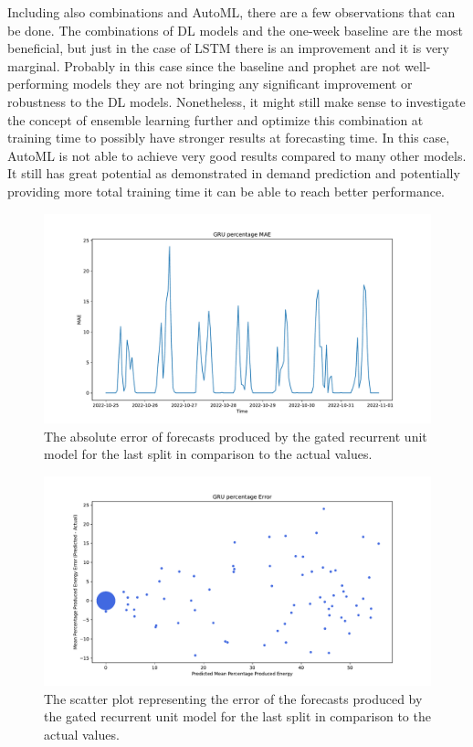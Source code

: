 Including also combinations and AutoML, there are a few observations that can be done.
The combinations of DL models and the one-week baseline are the most beneficial, but just in the case of LSTM there is an improvement and it is very marginal.
Probably in this case since the baseline and prophet are not well-performing models they are not bringing any significant improvement or robustness to the DL models.
Nonetheless, it might still make sense to investigate the concept of ensemble learning further and optimize this combination at training time to possibly have stronger results at forecasting time.
In this case, AutoML is not able to achieve very good results compared to many other models.
It still has great potential as demonstrated in demand prediction and potentially providing more total training time it can be able to reach better performance.

\begin{figure}[H]
\centering
\includegraphics[width=1\textwidth]{images/production/GRU_percentage_mae}
\caption{The absolute error of forecasts produced by the gated recurrent unit model for the last split in comparison to the actual values.}
\label{fig:productiongruhourlyforecastsmae}
\end{figure}

\begin{figure}[H]
\centering
\includegraphics[width=1\textwidth]{images/production/GRU_percentage_error_scatter_plot_predicted}
\caption{The scatter plot representing the error of the forecasts produced by the gated recurrent unit model for the last split in comparison to the actual values.}
\label{fig:productiongruhourlyforecastsscatterplot}
\end{figure}

